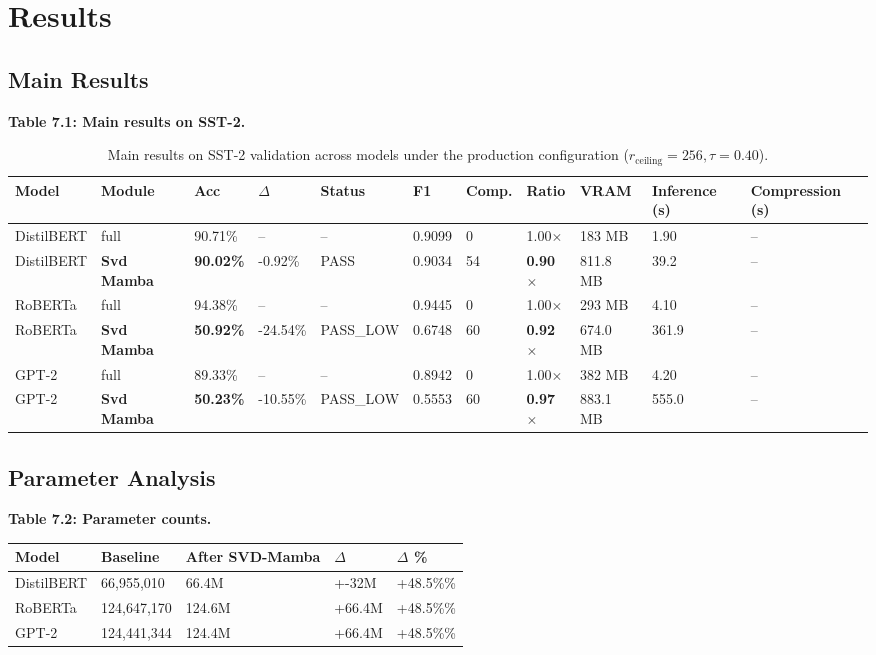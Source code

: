 
\section{Results}

\subsection{Main Results}

\textbf{Table 7.1: Main results on SST-2.}

\begin{table}[t]
\centering
\small
\begin{tabular}{lllllllllll}
\toprule
\textbf{Model} & \textbf{Module} & \textbf{Acc} & \textbf{$\Delta$} & \textbf{Status} & \textbf{F1} & \textbf{Comp.} & \textbf{Ratio} & \textbf{VRAM} & \textbf{Inference (s)} & \textbf{Compression (s)} \\
\midrule
DistilBERT & full & 90.71\% & -- & -- & 0.9099 & 0 & 1.00$\times$ & 183 MB & 1.90 & -- \\
DistilBERT & \textbf{Svd Mamba} & \textbf{90.02\%} & -0.92\% & PASS & 0.9034 & 54 & \textbf{0.90$\times$} & 811.8 MB & 39.2 & -- \\
RoBERTa & full & 94.38\% & -- & -- & 0.9445 & 0 & 1.00$\times$ & 293 MB & 4.10 & -- \\
RoBERTa & \textbf{Svd Mamba} & \textbf{50.92\%} & -24.54\% & PASS\_LOW & 0.6748 & 60 & \textbf{0.92$\times$} & 674.0 MB & 361.9 & -- \\
GPT-2 & full & 89.33\% & -- & -- & 0.8942 & 0 & 1.00$\times$ & 382 MB & 4.20 & -- \\
GPT-2 & \textbf{Svd Mamba} & \textbf{50.23\%} & -10.55\% & PASS\_LOW & 0.5553 & 60 & \textbf{0.97$\times$} & 883.1 MB & 555.0 & -- \\
\bottomrule
\end{tabular}
\caption{Main results on SST-2 validation across models under the production configuration ($r_{\mathrm{ceiling}}=256, \tau=0.40$).}
\label{tab:main_sst2}
\end{table}

\subsection{Parameter Analysis}

\textbf{Table 7.2: Parameter counts.}

\begin{table}[H]
\centering
\small
\begin{tabular}{lllll}
\toprule
\textbf{Model} & \textbf{Baseline} & \textbf{After SVD-Mamba} & \textbf{$\Delta$} & \textbf{$\Delta$ \%} \\
\midrule
DistilBERT & 66,955,010 & 66.4M & +-32M & +48.5\%\% \\
RoBERTa & 124,647,170 & 124.6M & +66.4M & +48.5\%\% \\
GPT-2 & 124,441,344 & 124.4M & +66.4M & +48.5\%\% \\
\bottomrule
\end{tabular}
\end{table}

